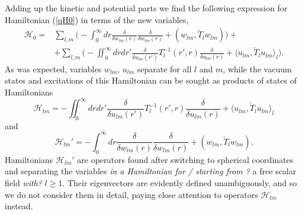 \documentclass[12pt]{article}
\newcommand{\HH}{\mathscr{H}}
\begin{document}
	Adding up the kinetic and potential parts we find the following
	expression for Hamiltonian
(\ref{qH0})
	in terms of the new variables,
\begin{align*}
    \HH_{0} =& \sum_{l,m} \bigl( -\int_{0}^{\infty} dr
	\frac{\delta}{\delta w_{lm}(r)} \frac{\delta}{\delta w_{lm}(r)}
	    + (w_{lm},\check{T}_{l} w_{lm})\bigr)+\\
    &+ \sum_{l,m} \bigl(-\iint_{0}^{\infty} dr dr'
    \frac{\delta}{\delta u_{lm}(r')} T_{l}^{-1}(r',r)
	\frac{\delta}{\delta u_{lm}(r)}
	    + \langle u_{lm}, \check{T}_{l} u_{lm}\rangle_{l} \bigr).
\end{align*}
	As was expected, variables
$ w_{lm} $, 
$ u_{lm} $
	separate for all
$ l $ and $ m $,
	while the vacuum states and excitations of this Hamiltonian
	can be sought as products of states of Hamiltonians
\begin{equation}
\label{Hlm}
    \HH_{lm} = -\iint_{0}^{\infty} dr dr'
    \frac{\delta}{\delta u_{lm}(r')} T_{l}^{-1}(r',r)
	\frac{\delta}{\delta u_{lm}(r)}
	+ \langle u_{lm}, \check{T}_{l}u_{lm}\rangle_{l}
\end{equation}
	and
\begin{equation*}
    \HH_{lm}' = -\int_{0}^{\infty} dr
	\frac{\delta}{\delta w_{lm}(r)} \frac{\delta}{\delta w_{lm}(r)}
	    + (w_{lm},\check{T}_{l} w_{lm}) .
\end{equation*}
	Hamiltonians
$ \HH_{lm}' $
	are operators found after switching to spherical coordinates
	and separating the variables {\it in a Hamiltonian for / starting from ?} a free scalar field {\it with?}
$ l \geq 1 $.
	Their eigenvectors are evidently defined unambiguously,
	and so we do not consider them in detail,
	paying close attention to operators
$ \HH_{lm} $ instead.



\end{document}
